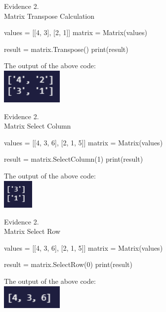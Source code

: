\begin{center}
    {\large Evidence 2.\rn } \\ 
    \vspace{0.3cm}
    Matrix Transpose Calculation \\
    \begin{pythoncode}
values = [[4, 3],
        [2, 1]]
matrix = Matrix(values)

result = matrix.Transpose()
print(result)

    \end{pythoncode}
    The output of the above code: \\
    \includegraphics[width=3cm]{Images/Testing/T2.13.1.PNG} \\
    \vspace{1cm}

    {\large Evidence 2.\rn } \\ 
    \vspace{0.3cm}
    Matrix Select Column \\
    \begin{pythoncode}
values = [[4, 3, 6],
        [2, 1, 5]]
matrix = Matrix(values)

result = matrix.SelectColumn(1)
print(result)
    \end{pythoncode}
    The output of the above code: \\
    \includegraphics[width=1.5cm]{Images/Testing/T2.14.1.PNG} \\
    \vspace{1cm}

    {\large Evidence 2.\rn } \\ 
    \vspace{0.3cm}
    Matrix Select Row \\
    \begin{pythoncode}
values = [[4, 3, 6],
        [2, 1, 5]]
matrix = Matrix(values)

result = matrix.SelectRow(0)
print(result)
    \end{pythoncode}
    The output of the above code: \\
    \includegraphics[width=3cm]{Images/Testing/T2.15.1.PNG} \\
    \vspace{1cm}
    

\end{center}
